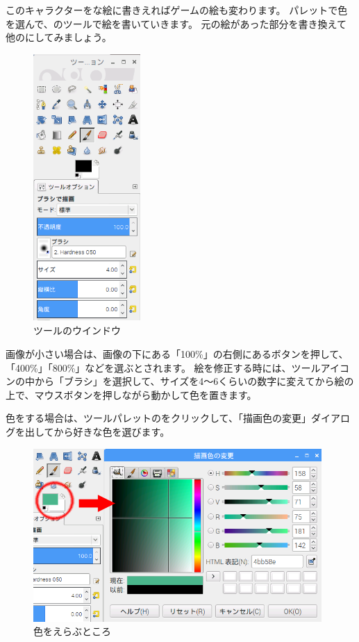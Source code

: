 このキャラクターをな絵に書きえればゲームの絵も変わります。
パレットで色を選んで、のツールで絵を書いていきます。
元の絵があった部分を書き換えて他のにしてみましょう。

\begin{figure}[H]
    \begin{center}
        \includegraphics[keepaspectratio,width=4.075cm,height=10.16cm]{text02-img/text02-img039.png}
        \caption{ツールのウインドウ}
    \end{center}
\end{figure}

画像が小さい場合は、画像の下にある「100\%」の右側にあるボタンを押して、「400\%」「800\%」などを選ぶとされます。
絵を修正する時には、ツールアイコンの中から「ブラシ」を選択して、サイズを4〜6くらいの数字に変えてから絵の上で、マウスボタンを押しながら動かして色を置きます。

色をする場合は、ツールパレットのをクリックして、「描画色の変更」ダイアログを出してから好きな色を選びます。

\begin{figure}[H]
    \begin{center}
        \includegraphics[keepaspectratio,width=10.993cm,height=6.588cm]{text02-img/text02-img040.png}
        \caption{色をえらぶところ}
    \end{center}
\end{figure}

